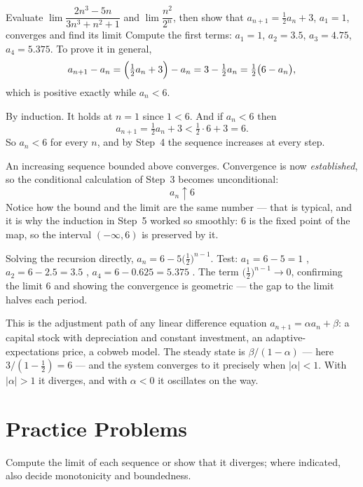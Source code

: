 \begin{worked}{Evaluate $\lim\dfrac{2n^{3}-5n}{3n^{3}+n^{2}+1}$ and $\lim\dfrac{n^{2}}{2^{n}}$, then show that $a_{n+1}=\tfrac12 a_{n}+3$, $a_{1}=1$, converges and find its limit}
Compute the first terms: $a_{1}=1$, $a_{2}=3.5$, $a_{3}=4.75$,
$a_{4}=5.375$. To prove it in general,
\[
  a_{n+1}-a_{n}=\Bigl(\tfrac12a_{n}+3\Bigr)-a_{n}=3-\tfrac12a_{n}
  =\tfrac12\bigl(6-a_{n}\bigr),
\]
which is positive exactly while $a_{n}<6$.

By induction. It holds at $n=1$ since $1<6$. And if $a_{n}<6$ then
\[
  a_{n+1}=\tfrac12a_{n}+3<\tfrac12\cdot6+3=6 .
\]
So $a_{n}<6$ for every $n$, and by Step~4 the sequence increases at every
step.

An increasing sequence bounded above converges. Convergence is now
\emph{established}, so the conditional calculation of Step~3 becomes
unconditional:
\[
  \boxed{a_{n}\uparrow 6}
\]
Notice how the bound and the limit are the same number --- that is typical,
and it is why the induction in Step~5 worked so smoothly: $6$ is the fixed
point of the map, so the interval $(-\infty,6)$ is preserved by it.

Solving the recursion directly, $a_{n}=6-5\bigl(\tfrac12\bigr)^{n-1}$. Test:
$a_{1}=6-5=1$ \checkmark, $a_{2}=6-2.5=3.5$ \checkmark,
$a_{4}=6-0.625=5.375$ \checkmark. The term $\bigl(\tfrac12\bigr)^{n-1}\to0$,
confirming the limit $6$ and showing the convergence is geometric --- the
gap to the limit halves each period.

This is the adjustment path of any linear difference equation
$a_{n+1}=\alpha a_{n}+\beta$: a capital stock with depreciation and constant
investment, an adaptive-expectations price, a cobweb model. The steady state
is $\beta/(1-\alpha)$ --- here $3/(1-\tfrac12)=6$ --- and the system
converges to it precisely when $|\alpha|<1$. With $|\alpha|>1$ it diverges,
and with $\alpha<0$ it oscillates on the way.
\end{worked}

\section{Practice Problems}

Compute the limit of each sequence or show that it diverges; where
indicated, also decide monotonicity and boundedness.

